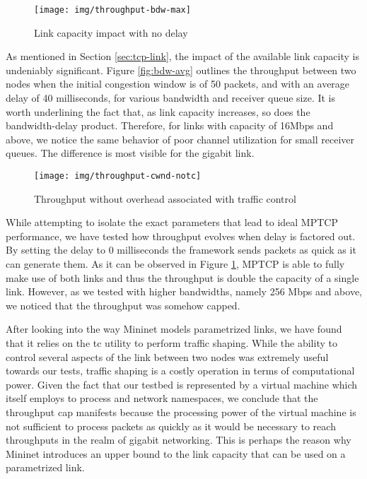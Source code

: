 \begin{figure}
  \centering
  \texttt{[image: img/throughput-bdw-max]}
  \caption{Link capacity impact with no delay}
  \label{fig:bdw-max}
\end{figure}

As mentioned in Section \ref{sec:tcp-link}, the impact of the available link
capacity is undeniably significant. Figure \ref{fig:bdw-avg} outlines the
throughput between two nodes when the initial congestion window is of 50
packets, and with an average delay of 40 milliseconds, for various bandwidth
and receiver queue size. It is worth underlining the fact that, as link
capacity increases, so does the bandwidth-delay product. Therefore, for links
with capacity of 16Mbps and above, we notice the same behavior of poor channel
utilization for small receiver queues. The difference is most visible for the
gigabit link.

\begin{figure}
  \centering
  \texttt{[image: img/throughput-cwnd-notc]}
  \caption{Throughput without overhead associated with traffic control}
  \label{fig:cwnd-notc}
\end{figure}

While attempting to isolate the exact parameters that lead to ideal MPTCP
performance, we have tested how throughput evolves when delay is factored
out. By setting the delay to 0 milliseconds the framework sends packets as
quick as it can generate them. As it can be observed in Figure
\ref{fig:bdw-max}, MPTCP is able to fully make use of both links and thus the
throughput is double the capacity of a single link. However, as we tested with
higher bandwidths, namely 256 Mbps and above, we noticed that the throughput
was somehow capped.

After looking into the way Mininet models parametrized links, we have found
that it relies on the tc utility to perform traffic shaping. While the ability
to control several aspects of the link between two nodes was extremely useful
towards our tests, traffic shaping is a costly operation in terms of
computational power. Given the fact that our testbed is represented by a
virtual machine which itself employs to process and network namespaces, we
conclude that the throughput cap manifests because the processing power of the
virtual machine is not sufficient to process packets as quickly as it would be
necessary to reach throughputs in the realm of gigabit networking. This is
perhaps the reason why Mininet introduces an upper bound to the link capacity
that can be used on a parametrized link.

